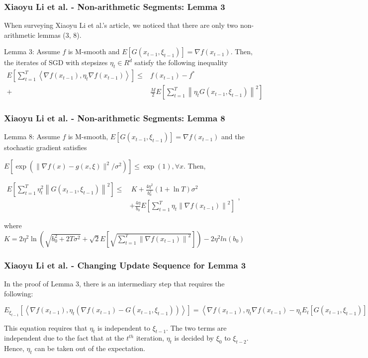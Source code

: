 \documentclass{beamer}
\begin{document}
\begin{frame}
\frametitle{Xiaoyu Li et al. - Non-arithmetic Segments: Lemma 3}
When surveying Xiaoyu Li et al.'s article, we noticed that there are only two non-arithmetic lemmas (3, 8).\par
\vspace{5mm}
Lemma 3: Assume $f$ is M-smooth and $E[G(x_{t-1},\xi_{t-1})]=\nabla f(x_{t-1})$. 
Then, the iterates of SGD with stepsizes $\eta_t \in R^{d}$ satisfy the following inequality
$\begin{aligned} E\left[\sum_{t=1}^T\left\langle\nabla f\left(x_{t-1}\right), \eta_t \nabla f\left(x_{t-1}\right)\right\rangle\right] \leq & f\left(x_{t-1}\right)-f^* \\  +\ &\frac{M}{2} E\left[\sum_{t=1}^T\left\|\eta_t G\left(x_{t-1}, \xi_{t-1}\right)\right\|^2\right]\end{aligned}$
\end{frame}

\begin{frame}
\frametitle{Xiaoyu Li et al. - Non-arithmetic Segments: Lemma 8}
Lemma 8: Assume $f$ is M-smooth, $E[G(x_{t-1},\xi_{t-1})]=\nabla f(x_{t-1})$ and the stochastic gradient satisfies \par\vspace{3mm}$E\left[\exp \left(\|\nabla f(x)-g(x, \xi)\|^2 / \sigma^2\right)\right] \leq \exp (1), \forall x$. Then, \par\vspace{3mm}
$\begin{aligned} E\left[\sum_{t=1}^T \eta_t^2\left\|G\left(x_{t-1}, \xi_{t-1}\right)\right\|^2\right] \leq &\ K+\frac{4 \eta^2}{b_0^2}(1+\ln T) \sigma^2 \\ & +\frac{4 \eta}{b_0} E\left[\sum_{t=1}^T \eta_t\left\|\nabla f\left(x_{t-1}\right)\right\|^2\right]
\end{aligned}$, \par\vspace{3mm} where \\
$K=2 \eta^2 \ln \left(\sqrt{b_0^2+2 T \sigma^2}+\sqrt{2} E\left[\sqrt{\sum_{t=1}^T\left\|\nabla f\left(x_{t-1}\right)\right\|^2}\right]\right)-2\eta^2 ln(b_0)$
\end{frame}

\begin{frame}
\frametitle{Xiaoyu Li et al. - Changing Update Sequence for Lemma 3}
In the proof of Lemma 3, there is an intermediary step that requires the following:
\par\vspace{5mm}
$E_{\xi_{t-1}}\left[\left\langle\nabla f\left(x_{t-1}\right), \eta_t\left(\nabla f\left(x_{t-1}\right)-G\left(x_{t-1}, \xi_{t-1}\right)\right)\right\rangle\right]=\left\langle\nabla f\left(x_{t-1}\right), \eta_t \nabla f\left(x_{t-1}\right)-\eta_t E_t\left[G\left(x_{t-1}, \xi_{t-1}\right)\right]\right\rangle=0$
\par\vspace{5mm}
This equation requires that $\eta_t$ is independent to $\xi_{t-1}$. The two terms are independent due to the fact that at the $t^{th}$ iteration, $\eta_t$ is decided by $\xi_0$ to $\xi_{t-2}$. Hence, $\eta_t$ can be taken out of the expectation.
\end{frame}
\end{document}
